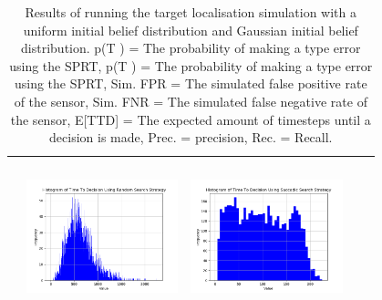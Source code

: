 \begin{landscape}
\begin{table}[h!]
\begin{tabular}{ | c | c | c | c | c |}
\begin{minipage}[c][45mm][c]{45mm}
    \end{minipage}
    &
    \begin{minipage}[c][45mm][c]{45mm}
      \includegraphics[width=44mm, height=44mm]{Chapters/MultiAgentTargetDetection/Figs/Results/Prior/Gaussian/SingleAgentSingleSourceGaussianRandomHistogram.png}
    \end{minipage}
    &
    \begin{minipage}[c][45mm][c]{45mm}
      \includegraphics[width=44mm, height=44mm]{Chapters/MultiAgentTargetDetection/Figs/Results/Prior/Gaussian/SingleAgentSingleSourceGaussianSaccadicHistogram.png}
    \end{minipage}
    \\


    \hline
   
  \end{tabular}
  \caption{Results of running the target localisation simulation with a  uniform initial belief distribution and Gaussian initial belief distribution. p(T ) = The probability of making a type  error using the SPRT, p(T ) = The probability of making a type  error using the SPRT, Sim. FPR = The simulated false positive rate of the sensor, Sim. FNR = The simulated false negative rate of the sensor, E[TTD] = The expected amount of timesteps until a decision is made, Prec. = precision, Rec. = Recall. }\label{table:ORToolsResults}
\end{table}
\end{landscape}
